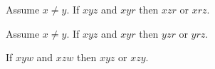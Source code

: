 \documentclass[10pt,a4paper,parskip=half,numbers=endperiod,headings=standardclasses,parskip]{scrbook}
\newcommand{\Betw}[3]{#1 #2 #3}
\newcommand{\Col}[3]{\operatorname{Col}(#1, #2, #3)}
\newcommand{\OFS}[8]{\operatorname{OFS}
\left(\begin{smallmatrix}%
#1 & #2 & #3 & #4 \\
#5 & #6 & #7 & #8
\end{smallmatrix}\right)%
}
\newcommand{\IFS}[8]{\operatorname{IFS}
\left(\begin{smallmatrix}%
#1 & #2 & #3 & #4 \\
#5 & #6 & #7 & #8
\end{smallmatrix}\right)%
}
\begin{document}
  \begin{forthel}

    \begin{axiom} %
      Assume $x \neq y$.
      If $\Betw{x}{y}{z}$ and $\Betw{x}{y}{r}$
      then $\Betw{x}{z}{r}$ or $\Betw{x}{r}{z}$.
    \end{axiom}

    \begin{lemma} %
      Assume $x \neq y$.
      If $\Betw{x}{y}{z}$ and $\Betw{x}{y}{r}$
      then $\Betw{y}{z}{r}$ or $\Betw{y}{r}{z}$.
    \end{lemma}

    \begin{theorem} %
      If $\Betw{x}{y}{w}$ and $\Betw{x}{z}{w}$ then $\Betw{x}{y}{z}$ or $\Betw{x}{z}{y}$.
    \end{theorem}
  \end{forthel}
\end{document}
